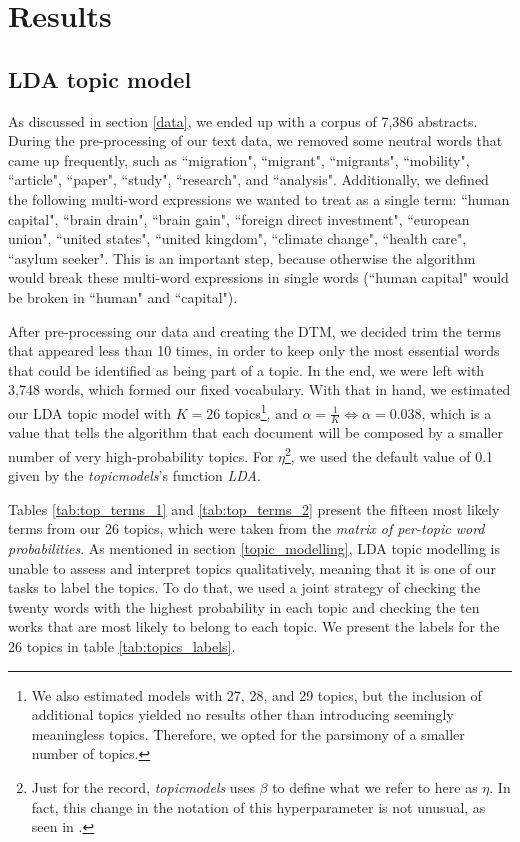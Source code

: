 \section{Results} \label{results}

\subsection{LDA topic model} \label{results_topic_model}

As discussed in section \ref{data}, we ended up with a corpus of 7,386 abstracts. During the pre-processing of our text data, we removed some neutral words that came up frequently, such as ``migration", ``migrant", ``migrants", ``mobility", ``article", ``paper", ``study", ``research", and ``analysis". Additionally, we defined the following multi-word expressions we wanted to treat as a single term: ``human capital", ``brain drain", ``brain gain", ``foreign direct investment", ``european union", ``united states", ``united kingdom", ``climate change", ``health care", ``asylum seeker". This is an important step, because otherwise the algorithm would break these multi-word expressions in single words (``human capital" would be broken in ``human" and ``capital").

After pre-processing our data and creating the DTM, we decided trim the terms that appeared less than 10 times, in order to keep only the most essential words that could be identified as being part of a topic. In the end, we were left with 3,748 words, which formed our fixed vocabulary. With that in hand, we estimated our LDA topic model with $K = 26$ topics\footnote{We also estimated models with 27, 28, and 29 topics, but the inclusion of additional topics yielded no results other than introducing seemingly meaningless topics. Therefore, we opted for the parsimony of a smaller number of topics.}, and $\alpha = \frac{1}{K} \Leftrightarrow \alpha = 0.038$, which is a value that tells the algorithm that each document will be composed by a smaller number of very high-probability topics. For $\eta$\footnote{Just for the record, \textit{topicmodels} uses $\beta$ to define what we refer to here as $\eta$. In fact, this change in the notation of this hyperparameter is not unusual, as seen in \cite{ponweiser_latent_2012}.}, we used the default value of 0.1 given by the \textit{topicmodels}'s function \textit{LDA}. 

Tables \ref{tab:top_terms_1} and \ref{tab:top_terms_2} present the fifteen most likely terms from our 26 topics, which were taken from the \textit{matrix of per-topic word probabilities}. As mentioned in section \ref{topic_modelling}, LDA topic modelling is unable to assess and interpret topics qualitatively, meaning that it is one of our tasks to label the topics. To do that, we used a joint strategy of checking the twenty words with the highest probability in each topic and checking the ten works that are most likely to belong to each topic. We present the labels for the 26 topics in table \ref{tab:topics_labels}. 


